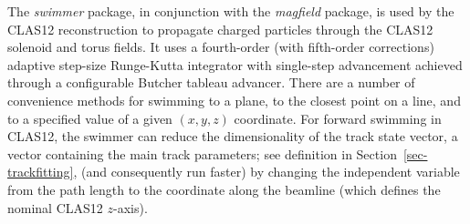 The {\it swimmer} package, in conjunction with the {\it magfield} package, is used by the CLAS12 reconstruction
to propagate charged particles through the CLAS12 solenoid and torus fields. It uses a fourth-order (with
fifth-order corrections) adaptive step-size Runge-Kutta integrator with single-step advancement achieved through
a configurable Butcher tableau advancer. There are a number of convenience methods for swimming to a plane, to
the closest point on a line, and to a specified value of a given $(x,y,z)$ coordinate. For forward swimming in CLAS12,
the swimmer can reduce the dimensionality of the track state vector, a vector containing the main track parameters;
see definition in Section~\ref{sec-trackfitting}, (and consequently run faster) by changing the independent variable
from the path length to the coordinate along the beamline (which defines the nominal CLAS12 $z$-axis).
